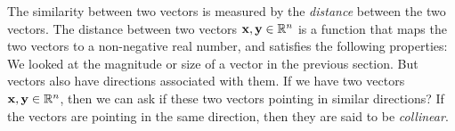 The similarity between two vectors is measured by the \textit{distance} between the two vectors. The distance between two vectors $\mathbf{x}, \mathbf{y} \in \mathbb{R}^n$ is a function that maps the two vectors to a non-negative real number, and satisfies the following properties:
We looked at the magnitude or size of a vector in the previous section. But vectors also have directions associated with them. If we have two vectors $\mathbf{x}, \mathbf{y} \in \mathbb{R}^n$, then we can ask if these two vectors pointing in similar directions? If the vectors are pointing in the same direction, then they are said to be \textit{collinear}.


